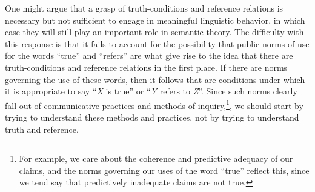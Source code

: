 One might argue that a grasp of truth-conditions and reference relations is necessary but not sufficient to engage in meaningful linguistic behavior, in which case they will still play an important role in semantic theory. The difficulty with this response is that it fails to account for the possibility that public norms of use for the words ``true'' and ``refers'' are what give rise to the idea that there are truth-conditions and reference relations in the first place. If there are norms governing the use of these words, then it follows that are conditions under which it is appropriate to say ``\textit{X} is true'' or ``\textit{Y} refers to \textit{Z}''. Since such norms clearly fall out of communicative practices and methods of inquiry,\footnote{For example, we care about the coherence and predictive adequacy of our claims, and the norms governing our uses of the word ``true'' reflect this, since we tend say that predictively inadequate claims are not true.}, we should start by trying to understand these methods and practices, not by trying to understand truth and reference.


